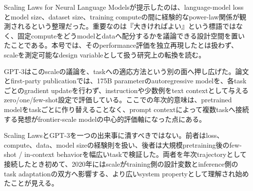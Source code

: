 Scaling Laws for Neural Language Modelsが提示したのは、language-model lossとmodel size、dataset size、training computeの間に経験的なpower-law関係が観測されるという整理だった。重要なのは『大きければよい』という標語ではなく、固定computeをどうmodelとdataへ配分するかを議論できる設計空間を置いたことである。本号では、そのperformance評価を独立再現したとは扱わず、scaleを測定可能なdesign variableとして扱う研究上の転換を読む。\autocite{src-7a3002b6ab1d}


GPT-3はこのscaleの議論を、taskへの適応方法という別の面へ押し広げた。論文とfirst-party publicationでは、175B parameterのautoregressive modelを、各taskごとのgradient updateを行わず、instructionや少数例をtext contextとして与えるzero/one/few-shot設定で評価している。ここでの年次的意味は、pretrained modelをtaskごとに作り替えることなく、prompt contextによって複数taskへ接続する発想がfrontier-scale modelの中心的評価軸になった点にある。\autocite{src-0fc45aa25dc7,src-8f27ffb5bc66}


Scaling LawsとGPT-3を一つの出来事に潰すべきではない。前者はloss、compute、data、model sizeの経験則を扱い、後者は大規模pretraining後のfew-shot / in-context behaviorを幅広いtaskで検証した。両者を年次trajectoryとして接続したとき初めて、2020年にはscaleがtraining側の設計変数とinference側のtask adaptationの双方へ影響する、より広いsystem propertyとして理解され始めたことが見える。\autocite{src-0fc45aa25dc7,src-7a3002b6ab1d,src-8f27ffb5bc66}


